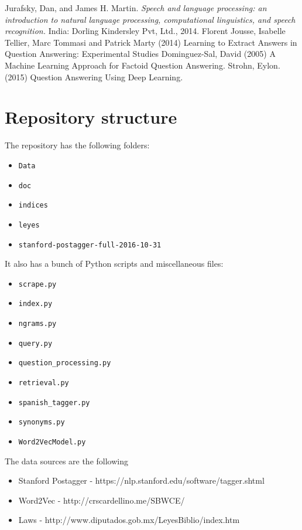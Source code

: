 \documentclass[letterpaper, margin=1in]{article}
\begin{document}
\newpage
\begin{thebibliography}{9}
  Jurafsky, Dan, and James H. Martin. 
  \emph{Speech and language processing: an introduction to natural language processing, computational linguistics, and speech recognition.} 
  India: Dorling Kindersley Pvt, Ltd., 2014.
 Florent Jousse, Isabelle Tellier, Marc Tommasi and Patrick Marty (2014) Learning to Extract Answers in Question Answering: Experimental Studies
 Dominguez-Sal, David (2005) A Machine Learning Approach for Factoid Question Answering.
Strohn, Eylon. (2015) Question Answering Using Deep Learning. 

\end{thebibliography}

\newpage
\appendix

\section{Repository structure}
The repository has the following folders:
\begin{itemize}
\item \texttt{Data}
\item \texttt{doc}
\item \texttt{indices}
\item \texttt{leyes}
\item \texttt{stanford-postagger-full-2016-10-31}
\end{itemize}

It also has a bunch of Python scripts and miscellaneous files:

\begin{itemize}
\item \texttt{scrape.py}
\item \texttt{index.py}
\item \texttt{ngrams.py}
\item \texttt{query.py}
\item \texttt{question{\_}processing.py}
\item \texttt{retrieval.py}
\item \texttt{spanish{\_}tagger.py}
\item \texttt{synonyms.py}
\item \texttt{Word2VecModel.py}
\end{itemize}

The data sources are the following 
\begin{itemize}
\item Stanford Postagger - https://nlp.stanford.edu/software/tagger.shtml
\item Word2Vec - http://crscardellino.me/SBWCE/
\item Laws - http://www.diputados.gob.mx/LeyesBiblio/index.htm
\end{itemize}
\end{document}

